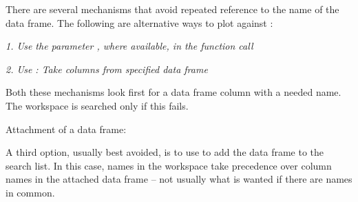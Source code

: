 There are several mechanisms that avoid repeated
reference to the name of the data frame.
The following are alternative ways to plot  against :
\begin{itemizz}
\item[]{\em 1. Use the parameter ,
where available, in
the function call}\\[-2pt]
\begin{knitrout}
\color{fgcolor}\begin{kframe}
\begin{alltt}
 \hlopt{~}  
\end{alltt}
\end{kframe}
\end{knitrout}
\item[]{\em 2. Use : Take columns from specified
data frame}\\[-2pt]
\begin{knitrout}
\color{fgcolor}\begin{kframe}
\begin{alltt}
  \hlopt{~} 
\end{alltt}
\end{kframe}
\end{knitrout}
\vspace*{-3pt}

\noindent
\end{itemizz}
Both these mechanisms look first for a data frame column with a needed
name. The workspace is searched only if this fails.

\begin{marginfigure}[84pt]
Attachment of a data frame:
\begin{knitrout}
\color{fgcolor}\begin{kframe}
\begin{alltt}
 \hlopt{~} 
\end{alltt}
\end{kframe}
\end{knitrout}
\end{marginfigure}
A third option, usually best avoided,
is to use  to add the data frame to the search list. In
this case, names in the workspace take precedence over column names in
the attached data frame -- not usually what is wanted if there are
names in common.

